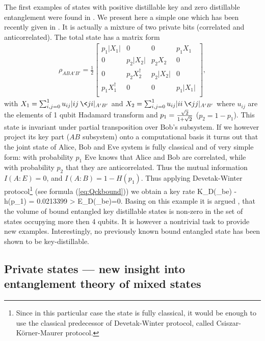 \documentclass[rmp,12pt,preprint]{revtex4-2}
\begin{document}
The first examples of states with positive distillable key and zero
distillable entanglement were found in \cite{pptkey,keyhuge}. We
present here a simple one which has been recently given in
\cite{smallkey}. It is actually a mixture of two private bits (correlated and anticorrelated). The total state has a
matrix form
\begin{eqnarray}
\rho_{ABA'B'}= \frac{1}{2}\left[ \begin{array}{cccc}
p_{1}|X_{1}| & 0 & 0 & p_{1}X_{1} \\
0 & p_{2}|X_{2}|& p_{2} X_{2} & 0 \\
0 & p_{2}X_{2}^{\dagger} & p_{2} |X_{2}| & 0\\
p_{1}X_{1}^{\dagger} & 0 & 0 & p_{1}|X_{1}|\\
\end{array}
\right],
\label{standform}
\end{eqnarray}
with $X_1 = \sum_{i,j=0}^1 u_{ij} |ij\>\<ji|_{A'B'}$ and $X_2 =
\sum_{i,j=0}^{1} u_{ij} |ii\>\<jj|_{A'B'}$ where $u_{ij}$ are the elements
of 1 qubit Hadamard transform and $ p_1 = {\sqrt{2}\over 1 +
\sqrt{2}}$ ($p_2=1-p_1$). This state is invariant under partial
transposition over Bob's subsystem. If we however project its key
part ($AB$ subsystem) onto a computational basis it turns out that
the joint state of Alice, Bob and Eve system is fully classical and of very
simple form: with probability $p_1$ Eve knows that Alice and
Bob are correlated, while with probability $p_2$ that they are
anticorrelated. Thus the mutual information $I(A:E)=0$, and
$I(A:B)=1-H(p_1)$. Thus applying Devetak-Winter
protocol\footnote{Since in  this particular case the state is fully
classical, it would be  enough to use the classical predecessor  of
Devetak-Winter protocol, called Csiszar-K{\"o}rner-Maurer protocol.}
(see formula (\ref{eq:Qckbound})) we obtain a key rate \be
K_D(\rho_{be})  - h(p_1) = 0.0213399 > E_D(\rho_{be})=0. \ee
Basing on this example it is argued \cite{smallkey}, that the volume
of bound entangled key distillable states is non-zero in the set of
states occupying more then 4 qubits. It is however a nontrivial task
to provide new examples. Interestingly, no previously known bound
entangled state has been shown to be key-distillable.

\subsection{Private states --- new insight into
entanglement theory of mixed states}
\end{document}
